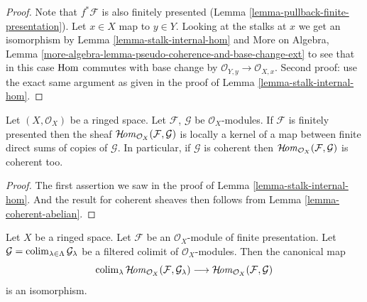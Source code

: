 \begin{proof}
Note that $f^*\mathcal{F}$ is also finitely presented
(Lemma \ref{lemma-pullback-finite-presentation}).
Let $x \in X$ map to $y \in Y$. Looking at the stalks
at $x$ we get an isomorphism by
Lemma \ref{lemma-stalk-internal-hom} and
More on Algebra, Lemma
\ref{more-algebra-lemma-pseudo-coherence-and-base-change-ext}
to see that in this case $\mathop{\mathrm{Hom}}\nolimits$ commutes with base change by
$\mathcal{O}_{Y, y} \to \mathcal{O}_{X, x}$.
Second proof: use the exact same argument as given
in the proof of Lemma \ref{lemma-stalk-internal-hom}.
\end{proof}

\begin{lemma}
\label{lemma-internal-hom-locally-kernel-direct-sum}
\begin{reference}
\cite[Chapter I, \S 2, no. 14, Proposition 6, p. 210]{FAC}
\end{reference}
Let $(X, \mathcal{O}_X)$ be a ringed space.
Let $\mathcal{F}$, $\mathcal{G}$ be $\mathcal{O}_X$-modules.
If $\mathcal{F}$ is finitely presented then the sheaf
$\mathop{\mathcal{H}\!\mathit{om}}\nolimits_{\mathcal{O}_X}(\mathcal{F}, \mathcal{G})$ is
locally a kernel of a map between finite direct sums
of copies of $\mathcal{G}$.
In particular, if $\mathcal{G}$ is coherent then
$\mathop{\mathcal{H}\!\mathit{om}}\nolimits_{\mathcal{O}_X}(\mathcal{F}, \mathcal{G})$
is coherent too.
\end{lemma}

\begin{proof}
The first assertion
we saw in the proof of Lemma \ref{lemma-stalk-internal-hom}.
And the result for coherent sheaves then follows from
Lemma \ref{lemma-coherent-abelian}.
\end{proof}

\begin{lemma}
\label{lemma-hom-finite-presentation-colimit}
Let $X$ be a ringed space. Let $\mathcal{F}$ be an $\mathcal{O}_X$-module
of finite presentation. Let
$\mathcal{G} = \mathop{\mathrm{colim}}\nolimits_{\lambda \in \Lambda} \mathcal{G}_\lambda$
be a filtered colimit of $\mathcal{O}_X$-modules. Then the canonical map
$$
\mathop{\mathrm{colim}}\nolimits_\lambda \mathop{\mathcal{H}\!\mathit{om}}\nolimits_{\mathcal{O}_X}(\mathcal{F}, \mathcal{G}_\lambda)
\longrightarrow
\mathop{\mathcal{H}\!\mathit{om}}\nolimits_{\mathcal{O}_X}(\mathcal{F}, \mathcal{G})
$$
is an isomorphism.
\end{lemma}

